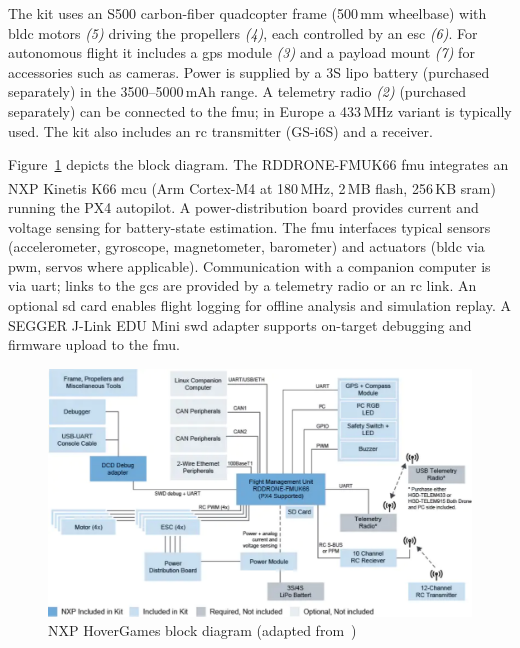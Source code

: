 The kit uses an S500 carbon-fiber quadcopter frame (500\,mm wheelbase) with
\gls{bldc} motors \emph{(5)} driving the propellers \emph{(4)}, each controlled by an
\gls{esc} \emph{(6)}. For autonomous flight it includes a \gls{gps} module \emph{(3)}
and a payload mount \emph{(7)} for accessories such as cameras. Power is supplied by a
3S \gls{lipo} battery (purchased separately) in the 3500–5000\,mAh range. A
telemetry radio \emph{(2)} (purchased separately) can be connected to the \gls{fmu};
in Europe a 433\,MHz variant is typically used. The kit also includes an
\gls{rc} transmitter (GS-i6S) and a receiver.

Figure~\ref{fig:hoverGames-blkDiag} depicts the block diagram. The
RDDRONE-FMUK66 \gls{fmu} integrates an NXP Kinetis\textsuperscript{\textregistered} K66
\gls{mcu} (Arm\textsuperscript{\textregistered} Cortex\textsuperscript{\textregistered}-M4 at 180\,MHz,
2\,MB flash, 256\,KB \gls{sram})~\cite{nxp-hoverGames-fmu} running the PX4
autopilot. A power-distribution board provides current and voltage sensing for
battery-state estimation. The \gls{fmu} interfaces typical sensors
(accelerometer, gyroscope, magnetometer, barometer) and actuators
(\gls{bldc} via \gls{pwm}, servos where applicable). Communication with a
companion computer is via \gls{uart}; links to the \gls{gcs} are provided by a
telemetry radio or an \gls{rc} link. An optional \gls{sd} card enables flight
logging for offline analysis and simulation replay. A SEGGER J-Link EDU Mini
\gls{swd} adapter supports on-target debugging and firmware upload to the \gls{fmu}.

\begin{figure}[!hbt]
  \centering
  \includegraphics[width=1.0\textwidth]{./img/pdf/hoverGames-blkDiag.pdf}
  \caption[NXP HoverGames block diagram]{NXP HoverGames block diagram (adapted from~\cite{nxp-hoverGames-uav})\footnotemark}
  \label{fig:hoverGames-blkDiag}
\end{figure}



